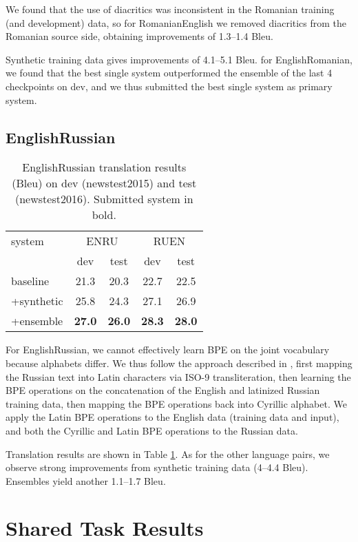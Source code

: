 \documentclass[11pt]{article}
\begin{document}
We found that the use of diacritics was inconsistent in the Romanian training (and development) data,  so
for RomanianEnglish we removed diacritics from the Romanian source side, obtaining improvements of 1.3--1.4 {\sc Bleu}.

Synthetic training data gives improvements of 4.1--5.1 {\sc Bleu}.
for EnglishRomanian, we found that the best single system outperformed the ensemble of the last 4 checkpoints on dev, and we thus submitted the best single system as primary system.

\subsection{EnglishRussian}

\begin{table}
\centering
\begin{tabular}{l|cc|cc}
system & \multicolumn{2}{c|}{ENRU} & \multicolumn{2}{c}{RUEN}\\
& dev & test & dev & test\\
\hline
baseline & 21.3 & 20.3 &22.7 & 22.5 \\ +synthetic & 25.8& 24.3 &27.1 & 26.9\\ +ensemble & \textbf{27.0} & \textbf{26.0} &\textbf{28.3} & \textbf{28.0}\\ \end{tabular}
\caption{EnglishRussian translation results ({\sc Bleu}) on dev (newstest2015) and test (newstest2016). Submitted system in bold.}
\label{results-ru}
\end{table}

For EnglishRussian, we cannot effectively learn BPE on the joint vocabulary because alphabets differ.
We thus follow the approach described in \cite{DBLP:journals/corr/SennrichHB15}, first mapping the Russian text into Latin characters via ISO-9 transliteration,
then learning the BPE operations on the concatenation of the English and latinized Russian training data, then mapping the BPE operations back into Cyrillic alphabet.
We apply the Latin BPE operations to the English data (training data and input), and both the Cyrillic and Latin BPE operations to the Russian data.

Translation results are shown in Table \ref{results-ru}.
As for the other language pairs, we observe strong improvements from synthetic training data (4--4.4 {\sc Bleu}).
Ensembles yield another 1.1--1.7 {\sc Bleu}.


\section{Shared Task Results}
\end{document}
